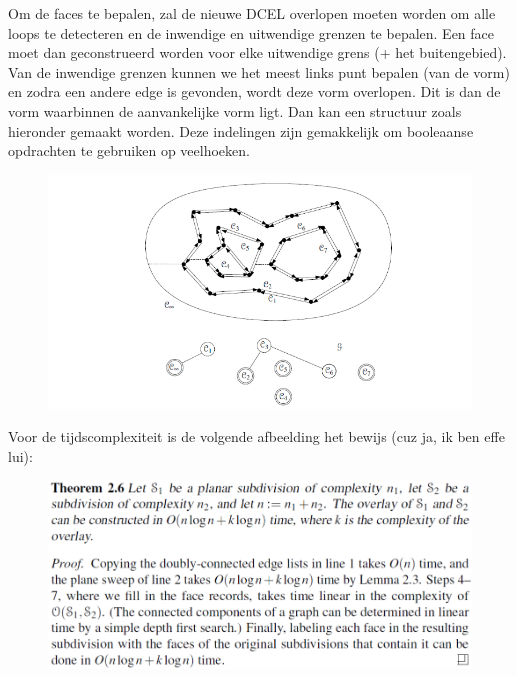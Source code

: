 \documentclass[12pt,a4paper]{article}
\begin{document}
	Om de faces te bepalen, zal de nieuwe DCEL overlopen moeten worden om alle loops te detecteren en de inwendige en uitwendige grenzen te bepalen. Een face moet dan geconstrueerd worden voor elke uitwendige grens (+ het buitengebied). Van de inwendige grenzen kunnen we het meest links punt bepalen (van de vorm) en zodra een andere edge is gevonden, wordt deze vorm overlopen. Dit is dan de vorm waarbinnen de aanvankelijke vorm ligt. Dan kan een structuur zoals hieronder gemaakt worden. Deze indelingen zijn gemakkelijk om booleaanse opdrachten te gebruiken op veelhoeken.
	
	\begin{figure}[H]
		\centering
		\includegraphics[width=0.7\linewidth]{afbeeldingen/DCEL-faces}
		\label{fig:dcel-faces}
	\end{figure}
	
	Voor de tijdscomplexiteit is de volgende afbeelding het bewijs (cuz ja, ik ben effe lui):
	
	\begin{figure}[H]
		\centering
		\includegraphics[width=0.7\linewidth]{afbeeldingen/DCEL-bewijs}
		\label{fig:dcel-bewijs}
	\end{figure}
	
	
\end{document}
